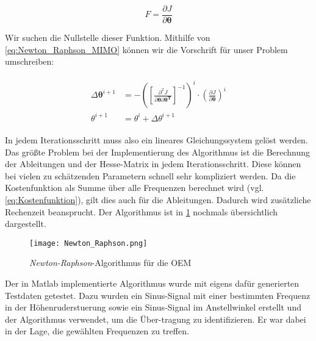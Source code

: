 \begin{equation}
	{F} = \frac{\partial J}{\partial \mathbf{\theta}}
	\label{eq:Newton_Raphson_1}
\end{equation}

Wir suchen die Nullstelle dieser Funktion. Mithilfe von \cref{eq:Newton_Raphson_MIMO} können wir die Vorschrift für 
unser Problem umschreiben:

\begin{align}
	\begin{split}
		\Delta \mathbf{\theta}^{i+1} &= -\left(\left[  \frac{\partial^{2}J}{\partial \mathbf{\theta} \partial 
		\mathbf{\theta^T}}\right]^{-1} \right)^{i} \cdot \left(\frac{\partial J}{\partial \mathbf{\theta}}\right)^{i} \\
		\theta^{i+1} &= \theta^{i} + \Delta\theta^{i+1}
		\label{eq:Newton_Raphson_2}
	\end{split}
\end{align}

In jedem Iterationsschritt muss also ein lineares Gleichungssystem gelöst werden. Das größte Problem bei der Implementierung 
des Algorithmus ist die Berechnung der Ableitungen und der Hesse-Matrix in jedem Iterationsschritt. Diese können bei vielen 
zu schätzenden Parametern schnell sehr kompliziert werden. Da die Kostenfunktion als Summe über alle Frequenzen berechnet 
wird (vgl. \cref{eq:Kostenfunktion}), gilt dies auch für die Ableitungen. Dadurch wird zusätzliche Rechenzeit beansprucht. 
Der Algorithmus ist in \cref{fig:Newton_Raphson} nochmals übersichtlich dargestellt.  

\begin{figure}[h!]
	\centering
	\texttt{[image: Newton\_Raphson.png]}
	\caption{\textit{Newton-Raphson}-Algorithmus für die OEM}
	\label{fig:Newton_Raphson}
\end{figure}

Der in Matlab implementierte Algorithmus wurde mit eigens dafür generierten Testdaten getestet. Dazu wurden ein Sinus-Signal 
mit einer bestimmten Frequenz in der Höhenruderstuerung sowie ein Sinus-Signal im Anstellwinkel erstellt und der Algorithmus 
verwendet, um die Über-tragung zu identifizieren. Er war dabei in der Lage, die gewählten Frequenzen zu treffen.




